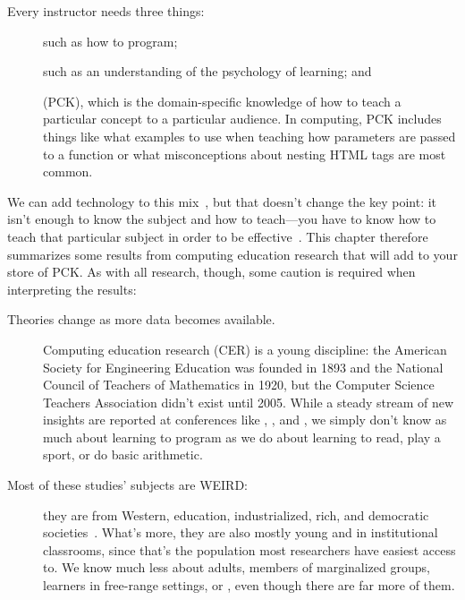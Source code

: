 
Every instructor needs three things:

\begin{description}

\item[]
  such as how to program;

\item[]
  such as an understanding of the psychology of learning;
  and

\item[]
  (PCK),
  which is the domain-specific knowledge of
  how to teach a particular concept to a particular audience.
  In computing,
  PCK includes things like what examples to use when teaching how parameters are passed to a function
  or what misconceptions about nesting HTML tags are most common.

\end{description}

We can add technology to this mix~\cite{Koeh2013},
but that doesn't change the key point:
it isn't enough to know the subject and how to teach---you have to know
how to teach that particular subject in order to be effective~\cite{Maye2004}.
This chapter therefore summarizes some results from computing education research
that will add to your store of PCK.
As with all research,
though,
some caution is required when interpreting the results:

\begin{description}

\item[Theories change as more data becomes available.]
  Computing education research (CER) is a young discipline:
  the American Society for Engineering Education was founded in 1893
  and the National Council of Teachers of Mathematics in 1920,
  but the Computer Science Teachers Association didn't exist until 2005.
  While a steady stream of new insights are reported at conferences like ,
  ,
  and ,
  we simply don't know as much about learning to program
  as we do about learning to read,
  play a sport,
  or do basic arithmetic.

\item[Most of these studies' subjects are WEIRD:]
  they are from Western, education, industrialized, rich, and democratic societies~\cite{Henr2010}.
  What's more,
  they are also mostly young and in institutional classrooms,
  since that's the population most researchers have easiest access to.
  We know much less about adults,
  members of marginalized groups,
  learners in free-range settings,
  or ,
  even though there are far more of them.

\end{description}

